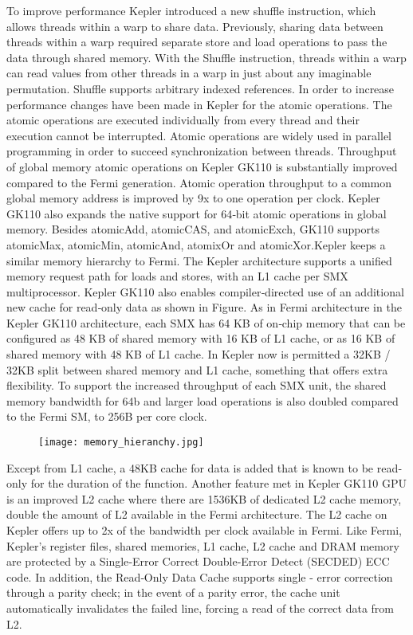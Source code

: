 To improve performance Kepler introduced a new shuffle instruction, which allows threads within a warp to share data. Previously, sharing data between threads within a warp required separate store and load operations to pass the data through shared memory. With the Shuffle instruction, threads within a warp can read values from other threads in a warp in just about any imaginable permutation. Shuffle supports arbitrary indexed references. In order to increase performance changes have been made in Kepler for the atomic operations. The atomic operations are executed individually from every thread and their execution cannot be interrupted. Atomic operations are widely used in parallel programming in order to succeed synchronization between threads. Throughput of global memory atomic operations on Kepler GK110 is substantially improved compared to the Fermi generation. Atomic operation throughput to a common global memory address is improved by 9x to one operation per clock. Kepler GK110 also expands the native support for 64‐bit atomic operations in global memory. Besides atomicAdd, atomicCAS, and atomicExch, GK110 supports atomicMax, atomicMin, atomicAnd, atomixOr and atomicXor.Kepler keeps a similar memory hierarchy to Fermi. The Kepler architecture supports a unified memory request path for loads and stores, with an L1 cache per SMX multiprocessor. Kepler GK110 also enables compiler‐directed use of an additional new cache for read‐only data as shown in Figure. As in Fermi architecture in the Kepler GK110 architecture, each SMX has 64 KB of on‐chip memory that can be configured as 48 KB of shared memory with 16 KB of L1 cache, or as 16 KB of shared memory with 48 KB of L1 cache. In Kepler now is permitted a 32KB / 32KB split between shared memory and L1 cache, something that offers extra flexibility. To support the increased throughput of each SMX unit, the shared memory bandwidth for 64b and larger load operations is also doubled compared to the Fermi SM, to 256B per core clock.

 \begin{figure}[H]
    \centering
        \texttt{[image: memory\_hieranchy.jpg]}
    \caption{}
    \label{fig:warp_scheduler}
\end{figure}

Except from L1 cache, a 48KB cache for data is added that is known to be read‐only for the duration of the function. Another feature met in Kepler GK110 GPU is an improved L2 cache where there are 1536KB of dedicated L2 cache memory, double the amount of L2 available in the Fermi architecture. The L2 cache on Kepler offers up to 2x of the bandwidth per clock available in Fermi. Like Fermi, Kepler’s register files, shared memories, L1 cache, L2 cache and DRAM memory are protected by a Single‐Error Correct Double‐Error Detect (SECDED) ECC code. In addition, the Read‐Only Data Cache supports single - error correction through a parity check; in the event of a parity error, the cache unit automatically invalidates the failed line, forcing a read of the correct data from L2.



